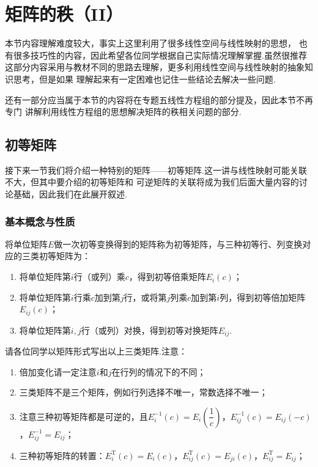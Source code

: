 \chapter{矩阵的秩（II）}
本节内容理解难度较大，事实上这里利用了很多线性空间与线性映射的思想，
也有很多技巧性的内容，因此希望各位同学根据自己实际情况理解掌握.虽然很推荐
这部分内容采用与教材不同的思路去理解，更多利用线性空间与线性映射的抽象知识思考，但是如果
理解起来有一定困难也记住一些结论去解决一些问题.

还有一部分应当属于本节的内容将在专题五线性方程组的部分提及，因此本节不再专门
讲解利用线性方程组的思想解决矩阵的秩相关问题的部分.

\section{初等矩阵}
接下来一节我们将介绍一种特别的矩阵——初等矩阵.这一讲与线性映射可能关联不大，但其中要介绍的初等矩阵和
可逆矩阵的关联将成为我们后面大量内容的讨论基础，因此我们在此展开叙述.

\subsection{基本概念与性质}
\begin{definition}
    将单位矩阵$E$做一次初等变换得到的矩阵称为初等矩阵，与三种初等行、列变换对应的三类初等矩阵为：
    \begin{enumerate}
        \item 将单位矩阵第$i$行（或列）乘$c$，得到初等倍乘矩阵$E_i(c)$；

        \item 将单位矩阵第$i$行乘$c$加到第$j$行，或将第$j$列乘$c$加到第$i$列，得到初等倍加矩阵$E_{ij}(c)$；

        \item 将单位矩阵第$i,j$行（或列）对换，得到初等对换矩阵$E_{ij}$.
    \end{enumerate}
\end{definition}
请各位同学以矩阵形式写出以上三类矩阵.注意：
\begin{enumerate}
    \item 倍加变化请一定注意$i$和$j$在行列的情况下的不同；

    \item 三类矩阵不是三个矩阵，例如行列选择不唯一，常数选择不唯一；

    \item 注意三种初等矩阵都是可逆的，且$E_i^{-1}(c)=E_i\left(\dfrac{1}{c}\right)$，$E_{ij}^{-1}(c)=E_{ij}(-c)$，$E_{ij}^{-1}=E_{ij}$；

    \item 三种初等矩阵的转置：$E_i^\mathrm{T}(c)=E_i(c)$，$E_{ij}^\mathrm{T}(c)=E_{ji}(c)$，$E_{ij}^\mathrm{T}=E_{ij}$；
\end{enumerate}

